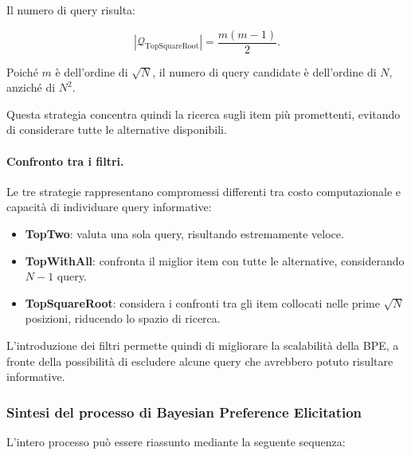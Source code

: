 Il numero di query risulta:

\[
|\mathcal{Q}_{\mathrm{TopSquareRoot}}|
=
\frac{m(m-1)}{2}.
\]

Poiché $m$ è dell'ordine di $\sqrt{N}$, il numero di query candidate è dell'ordine di $N$, anziché di $N^2$.

Questa strategia concentra quindi la ricerca sugli item più promettenti, evitando di considerare tutte le alternative disponibili.

\paragraph{Confronto tra i filtri.}

Le tre strategie rappresentano compromessi differenti tra costo computazionale e capacità di individuare query informative:

\begin{itemize}
    \item \textbf{TopTwo}: valuta una sola query, risultando estremamente veloce.
    \item \textbf{TopWithAll}: confronta il miglior item con tutte le alternative, considerando $N-1$ query.
    \item \textbf{TopSquareRoot}: considera i confronti tra gli item collocati nelle prime $\sqrt{N}$ posizioni, riducendo lo spazio di ricerca.
\end{itemize}

L'introduzione dei filtri permette quindi di migliorare la scalabilità della BPE, a fronte della possibilità di escludere alcune query che avrebbero potuto risultare informative.


\subsubsection{Sintesi del processo di Bayesian Preference Elicitation}

L'intero processo può essere riassunto mediante la seguente sequenza:

